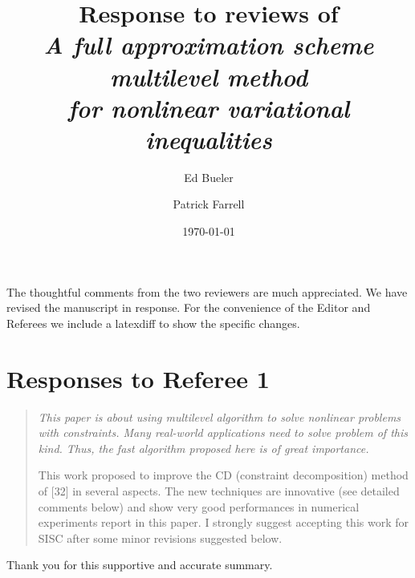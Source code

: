 \documentclass[letterpaper,final,12pt,reqno]{amsart}
\newenvironment{review}%
{\bigskip \par \begin{quote} \selectfont \sl}%
{\end{quote}}
\newcommand\short[1]{\medskip\noindent #1}   %
\begin{document}
\title[Response to reviews]{Response to reviews of \\ \emph{A full approximation scheme multilevel method \\ for nonlinear variational inequalities}}

\author{Ed Bueler}

\author{Patrick Farrell}

\date{\today}

\maketitle


\thispagestyle{empty}

The thoughtful comments from the two reviewers are much appreciated.  We have revised the manuscript in response. For the convenience of the Editor and Referees we include a latexdiff to show the specific changes.


\section{Responses to Referee 1}


\begin{review}
This paper is about using multilevel algorithm to solve nonlinear problems with constraints. Many real-world applications need to solve problem of this kind. Thus, the fast algorithm proposed here is of great importance.

This work proposed to improve the CD (constraint decomposition) method of [32] in several aspects. The new techniques are innovative (see detailed comments below) and show very good performances in numerical experiments report in this paper. I strongly suggest accepting this work for SISC after some minor revisions suggested below.
\end{review}

\short{Thank you for this supportive and accurate summary.}
\end{document}
